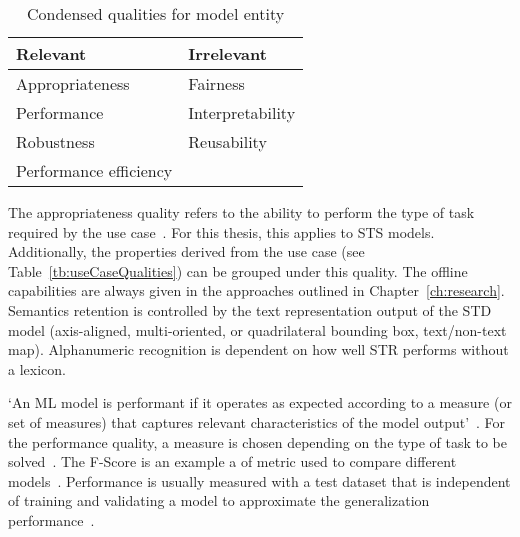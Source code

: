 \begin{table}[h]
    \centering\scriptsize
    \begin{tabular}{l l}
        \textbf{Relevant}                & \textbf{Irrelevant} \\
        \toprule
        Appropriateness         & Fairness  \\
        Performance             & Interpretability \\
        Robustness              & Reusability \\
        Performance efficiency  & \\
    \end{tabular}
    \caption{Condensed qualities for model entity\label{tb:condensedQualities}}
\end{table}

The appropriateness quality refers to the ability to perform the type of task required by
the use case~\citep{siebert_construction_2021,nakamichi_requirements-driven_2020}.
For this thesis, this applies to \ac{STS} models.
Additionally, the properties derived from the use case (see
Table~\ref{tb:useCaseQualities}) can be grouped under this quality.
The offline capabilities are always given in the approaches outlined in Chapter~\ref{ch:research}.
Semantics retention is controlled by the text representation output of the \ac{STD} model (axis-aligned,
multi-oriented, or quadrilateral bounding box, text/non-text map).
Alphanumeric recognition is dependent on how well \ac{STR} performs without a lexicon.

`An ML model is performant if it operates as expected according to a measure (or set of measures)
that captures relevant characteristics of the model output'~\citep{ashmore_assuring_2021}.
For the performance quality, a measure is chosen depending on the type of task to be
solved~\citep{siebert_construction_2021}.
The F-Score is an example a of metric used to compare different
models~\citep{chen_text_2021, long_scene_2021}.
Performance is usually measured with a test dataset that is independent of training and validating
a model to approximate the generalization performance~\citep{goodfellow_deep_2016,
nakamichi_requirements-driven_2020}.

